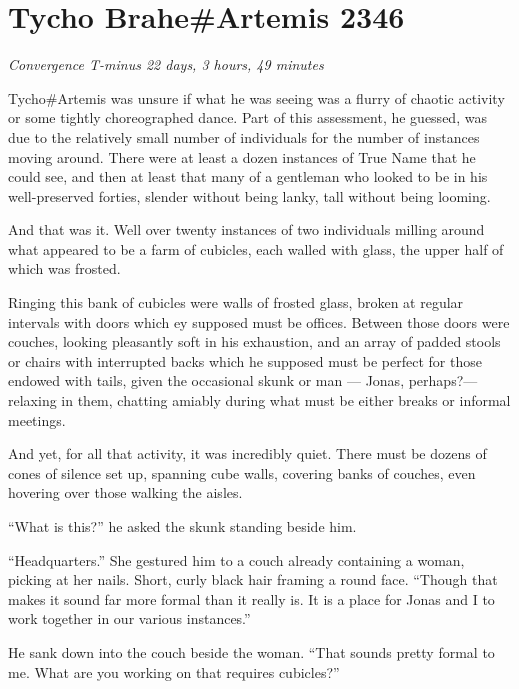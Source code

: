 \hypertarget{tycho-braheartemis-2346}{%
\chapter{Tycho Brahe\#Artemis 2346}}

\begin{center}
\emph{Convergence T-minus 22 days, 3 hours, 49 minutes}
\end{center}

\noindent Tycho\#Artemis was unsure if what he was seeing was a flurry of chaotic activity or some tightly choreographed dance. Part of this assessment, he guessed, was due to the relatively small number of individuals for the number of instances moving around. There were at least a dozen instances of True Name that he could see, and then at least that many of a gentleman who looked to be in his well-preserved forties, slender without being lanky, tall without being looming.

And that was it. Well over twenty instances of two individuals milling around what appeared to be a farm of cubicles, each walled with glass, the upper half of which was frosted.

Ringing this bank of cubicles were walls of frosted glass, broken at regular intervals with doors which ey supposed must be offices. Between those doors were couches, looking pleasantly soft in his exhaustion, and an array of padded stools or chairs with interrupted backs which he supposed must be perfect for those endowed with tails, given the occasional skunk or man — Jonas, perhaps?—relaxing in them, chatting amiably during what must be either breaks or informal meetings.

And yet, for all that activity, it was incredibly quiet. There must be dozens of cones of silence set up, spanning cube walls, covering banks of couches, even hovering over those walking the aisles.

``What is this?'' he asked the skunk standing beside him.

``Headquarters.'' She gestured him to a couch already containing a woman, picking at her nails. Short, curly black hair framing a round face. ``Though that makes it sound far more formal than it really is. It is a place for Jonas and I to work together in our various instances.''

He sank down into the couch beside the woman. ``That sounds pretty formal to me. What are you working on that requires cubicles?''

